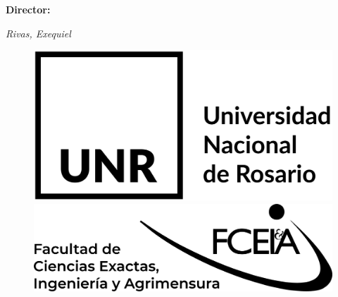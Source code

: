 \begin{titlepage}
	
	
	\vspace{2\baselineskip} %

        \Large{\textbf{Director:}}
	
	
    {\itshape\LARGE Rivas, Exequiel}

	\vspace*{7\baselineskip} %
    
    \begin{figure}[h] %
	\centering
	\includegraphics[height=4\baselineskip]{img/UNR.png} \hfill \includegraphics[height=3.7\baselineskip]{img/FCEIA.png} 
	\end{figure}
    
    \vfill %
	
		
	\vspace{0.2\baselineskip} %
	
	

\end{titlepage}

